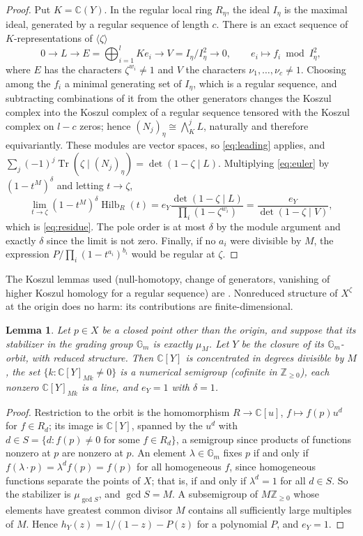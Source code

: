 \documentclass[11pt,a4paper]{article}
\newtheorem{lemma}[theorem]{Lemma}
\theoremstyle{definition}
\newcommand{\C}{\mathbb{C}}
\newcommand{\Z}{\mathbb{Z}}
\newcommand{\Gm}{\mathbb{G}_m}
\newcommand{\Hilb}{\operatorname{Hilb}}
\newcommand{\Tr}{\operatorname{Tr}}
\begin{document}
\begin{proof}
Put $K=\C(Y)$. In the regular local ring $R_\eta$, the ideal $I_\eta$ is the
maximal ideal, generated by a regular sequence of length $c$. There is an
exact sequence of $K$-representations of $\langle\zeta\rangle$
\[
 0\to L\to E=\bigoplus_{i=1}^lKe_i\to V=I_\eta/I_\eta^2\to0,\qquad
 e_i\mapsto f_i\bmod I_\eta^2 ,
\]
where $E$ has the characters $\zeta^{w_i}\ne1$ and $V$ the characters
$\nu_1,\dots,\nu_c\ne1$. Choosing among the $f_i$ a minimal generating set of
$I_\eta$, which is a regular sequence, and subtracting combinations of it from
the other generators changes the Koszul complex into the Koszul complex of a
regular sequence tensored with the Koszul complex on $l-c$ zeros; hence
$(N_j)_\eta\cong\bigwedge^j_KL$, naturally and therefore equivariantly. These
modules are vector spaces, so \eqref{eq:leading} applies, and
$\sum_j(-1)^j\Tr(\zeta\mid(N_j)_\eta)=\det(1-\zeta\mid L)$. Multiplying
\eqref{eq:euler} by $(1-t^M)^\delta$ and letting $t\to\zeta$,
\[
 \lim_{t\to\zeta}(1-t^M)^\delta\Hilb_R(t)
 =e_Y\frac{\det(1-\zeta\mid L)}{\prod_i(1-\zeta^{w_i})}
 =\frac{e_Y}{\det(1-\zeta\mid V)} ,
\]
which is \eqref{eq:residue}. The pole order is at most $\delta$ by the module
argument and exactly $\delta$ since the limit is not zero. Finally, if no
$a_i$ were divisible by $M$, the expression $P/\prod_i(1-t^{a_i})^{b_i}$
would be regular at $\zeta$.
\end{proof}

The Koszul lemmas used (null-homotopy, change of generators, vanishing of
higher Koszul homology for a regular sequence) are
\cite[Tags 0621, 062F]{Stacks}. Nonreduced structure of $X^\zeta$ at the
origin does no harm: its contributions are finite-dimensional.

\begin{lemma}\label{lem:orbitclosure}
Let $p\in X$ be a closed point other than the origin, and suppose that its
stabilizer in the grading group $\Gm$ is exactly $\mu_M$. Let $Y$ be the
closure of its $\Gm$-orbit, with reduced structure. Then $\C[Y]$ is
concentrated in degrees divisible by $M$, the set $\{k:\C[Y]_{Mk}\ne0\}$ is a
numerical semigroup (cofinite in $\Z_{\ge0}$), each nonzero
$\C[Y]_{Mk}$ is a line, and $e_Y=1$ with $\delta=1$.
\end{lemma}

\begin{proof}
Restriction to the orbit is the homomorphism $R\to\C[u]$, $f\mapsto f(p)u^d$
for $f\in R_d$; its image is $\C[Y]$, spanned by the $u^d$ with $d\in S=\{d:
f(p)\ne0\text{ for some }f\in R_d\}$, a semigroup since products of functions
nonzero at $p$ are nonzero at $p$. An element $\lambda\in\Gm$ fixes $p$ if and
only if $f(\lambda\cdot p)=\lambda^df(p)=f(p)$ for all homogeneous $f$, since
homogeneous functions separate the points of $X$; that is, if and only if
$\lambda^d=1$ for all $d\in S$. So the stabilizer is $\mu_{\gcd S}$, and
$\gcd S=M$. A subsemigroup of $M\Z_{\ge0}$ whose elements have greatest
common divisor $M$ contains all sufficiently large multiples of $M$. Hence
$h_Y(z)=1/(1-z)-P(z)$ for a polynomial $P$, and $e_Y=1$.
\end{proof}
\end{document}
